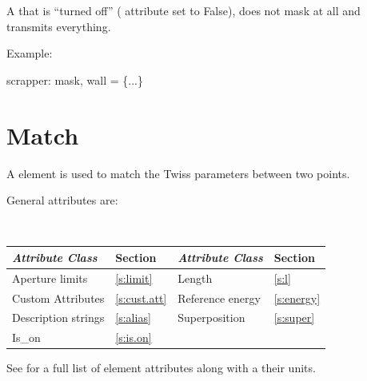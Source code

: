 {A  that is ``turned off'' ( attribute set to
False), does not mask at all and transmits everything.

Example:
\begin{example}
  scrapper: mask, wall = \{...\}
\end{example}

\section{Match}
\label{s:match}

A  element is used to match the Twiss parameters between two
points. 

General  attributes are:
\begin{center} 
\tt
\begin{tabular}{llll} \toprule
  {\sl Attribute Class}      & Section           & {\sl Attribute Class}      & Section         \\ \midrule
  Aperture limits            & \ref{s:limit}     & Length                     & \ref{s:l}       \\
  Custom Attributes          & \ref{s:cust.att}  & Reference energy           & \ref{s:energy}  \\ 
  Description strings        & \ref{s:alias}     & Superposition              & \ref{s:super}   \\ 
  Is_on                      & \ref{s:is.on}     &                            &                 \\
  \bottomrule
\end{tabular}
\end{center}
\toffset
See  for a full list of element attributes along with a their units.

}
